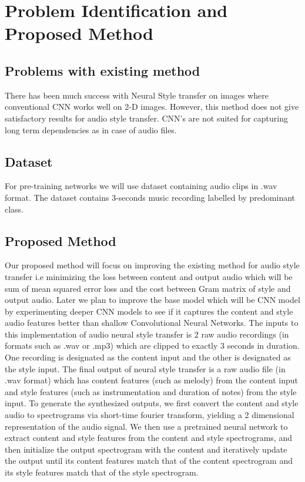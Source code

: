 \documentclass[10pt,twocolumn,letterpaper]{article}
\begin{document}
\section{Problem Identification and Proposed Method}
\subsection{Problems with existing method}
There has been much success with Neural Style transfer
on images where conventional CNN works well on 2-D
images. However, this method does not give satisfactory
results for audio style transfer. CNN’s are not suited for
capturing long term dependencies as in case of audio files.

\subsection{Dataset}
For pre-training networks we will use dataset containing audio clips in .wav format. The dataset  contains 3-seconds music recording labelled by predominant class.

\subsection{Proposed Method}
Our proposed method will focus on improving the existing method for audio
style transfer i.e minimizing the loss between content
and output audio which will be sum of mean squared error
loss and the cost between Gram matrix of style and output
audio. Later we plan to improve the base model which will be CNN model by experimenting deeper CNN models to see if it captures the content and style audio features better than shallow Convolutional Neural Networks.
The inputs to this implementation of audio neural style transfer is 2 raw audio recordings (in formats such as .wav or .mp3) which are clipped to exactly 3 seconds in duration. One recording is designated as the content input and the other is designated as the style input. The final output of neural style transfer is a raw audio file (in .wav format) which has content features (such as melody)
from the content input and style features (such as instrumentation and duration of notes) from the
style input. 
To generate the synthesized outputs, we first convert the content and style audio to spectrograms via short-time fourier transform, yielding a 2 dimensional representation of the audio signal. We then use a pretrained neural network to extract content and style features from the content and style spectrograms, and then initialize the output spectrogram with the content and iteratively update the output until its content features match that of the content spectrogram and its style features match that of the style spectrogram.
\end{document}
